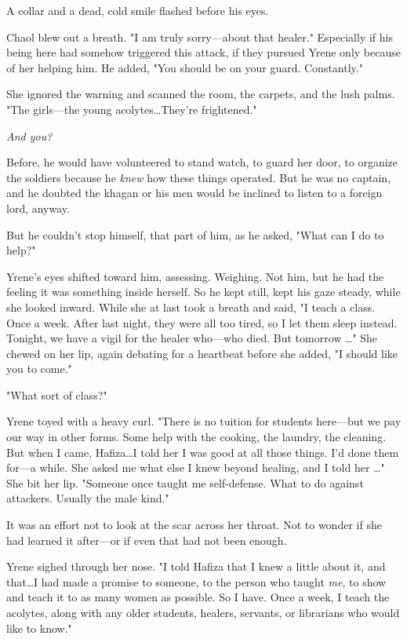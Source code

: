 A collar and a dead, cold smile flashed before his eyes.

Chaol blew out a breath.
"I am truly sorry---about that healer."
Especially if his being here had somehow triggered this attack, if they pursued Yrene only because of her helping him.
He added, "You should be on your guard.
Constantly."

She ignored the warning and scanned the room, the carpets, and the lush palms.
"The girls---the young acolytes\ldots They're frightened."

\emph{And you?}

Before, he would have volunteered to stand watch, to guard her door, to organize the soldiers because he \emph{knew} how these things operated.
But he was no captain, and he doubted the khagan or his men would be inclined to listen to a foreign lord, anyway.

But he couldn't stop himself, that part of him, as he asked, "What can I do to help?"

Yrene's eyes shifted toward him, assessing.
Weighing.
Not him, but he had the feeling it was something inside herself.
So he kept still, kept his gaze steady, while she looked inward.
While she at last took a breath and said, "I teach a class.
Once a week.
After last night, they were all too tired, so I let them sleep instead.
Tonight, we have a vigil for the healer who---who died.
But tomorrow \ldots" She chewed on her lip, again debating for a heartbeat before she added, "I should like you to come."

"What sort of class?"

Yrene toyed with a heavy curl.
"There is no tuition for students here---but we pay our way in other forms.
Some help with the cooking, the laundry, the cleaning.
But when I came, Hafiza\ldots I told her I was good at all those things.
I'd done them for---a while.
She asked me what else I knew beyond healing, and I told her \ldots" She bit her lip.
"Someone once taught me self-defense.
What to do against attackers.
Usually the male kind."

It was an effort not to look at the scar across her throat.
Not to wonder if she had learned it after---or if even that had not been enough.

Yrene sighed through her nose.
"I told Hafiza that I knew a little about it, and that\ldots I had made a promise to someone, to the person who taught \emph{me}, to show and teach it to as many women as possible.
So I have.
Once a week, I teach the acolytes, along with any older students, healers, servants, or librarians who would like to know."

